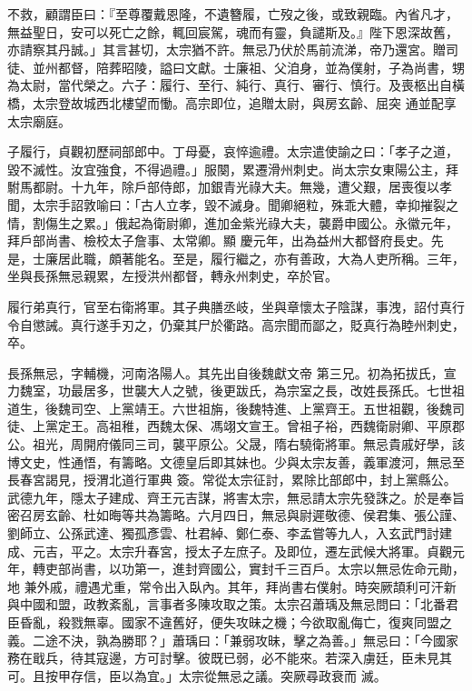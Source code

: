 \begin{pinyinscope}
 不救，顧謂臣曰：『至尊覆戴恩隆，不遺簪履，亡歿之後，或致親臨。內省凡才，無益聖日，安可以死亡之餘，輒回宸駕，魂而有靈，負譴斯及。』陛下恩深故舊，亦請察其丹誠。」其言甚切，太宗猶不許。無忌乃伏於馬前流涕，帝乃還宮。贈司徒、並州都督，陪葬昭陵，謚曰文獻。士廉祖、父洎身，並為僕射，子為尚書，甥為太尉，當代榮之。六子：履行、至行、純行、真行、審行、慎行。及喪柩出自橫橋，太宗登故城西北樓望而慟。高宗即位，追贈太尉，與房玄齡、屈突
 通並配享太宗廟庭。



 子履行，貞觀初歷祠部郎中。丁母憂，哀悴逾禮。太宗遣使諭之曰：「孝子之道，毀不滅性。汝宜強食，不得過禮。」服闋，累遷滑州刺史。尚太宗女東陽公主，拜駙馬都尉。十九年，除戶部侍郎，加銀青光祿大夫。無幾，遭父艱，居喪復以孝聞，太宗手詔敦喻曰：「古人立孝，毀不滅身。聞卿絕粒，殊乖大體，幸抑摧裂之情，割傷生之累。」俄起為衛尉卿，進加金紫光祿大夫，襲爵申國公。永徽元年，拜戶部尚書、檢校太子詹事、太常卿。顯
 慶元年，出為益州大都督府長史。先是，士廉居此職，頗著能名。至是，履行繼之，亦有善政，大為人吏所稱。三年，坐與長孫無忌親累，左授洪州都督，轉永州刺史，卒於官。



 履行弟真行，官至右衛將軍。其子典膳丞岐，坐與章懷太子陰謀，事洩，詔付真行令自懲誡。真行遂手刃之，仍棄其尸於衢路。高宗聞而鄙之，貶真行為睦州刺史，卒。



 長孫無忌，字輔機，河南洛陽人。其先出自後魏獻文帝
 第三兄。初為拓拔氏，宣力魏室，功最居多，世襲大人之號，後更跋氏，為宗室之長，改姓長孫氏。七世祖道生，後魏司空、上黨靖王。六世祖旃，後魏特進、上黨齊王。五世祖觀，後魏司徒、上黨定王。高祖稚，西魏太保、馮翊文宣王。曾祖子裕，西魏衛尉卿、平原郡公。祖光，周開府儀同三司，襲平原公。父晟，隋右驍衛將軍。無忌貴戚好學，該博文史，性通悟，有籌略。文德皇后即其妹也。少與太宗友善，義軍渡河，無忌至長春宮謁見，授渭北道行軍典
 簽。常從太宗征討，累除比部郎中，封上黨縣公。武德九年，隱太子建成、齊王元吉謀，將害太宗，無忌請太宗先發誅之。於是奉旨密召房玄齡、杜如晦等共為籌略。六月四日，無忌與尉遲敬德、侯君集、張公謹、劉師立、公孫武達、獨孤彥雲、杜君綽、鄭仁泰、李孟嘗等九人，入玄武門討建成、元吉，平之。太宗升春宮，授太子左庶子。及即位，遷左武候大將軍。貞觀元年，轉吏部尚書，以功第一，進封齊國公，實封千三百戶。太宗以無忌佐命元勛，地
 兼外戚，禮遇尤重，常令出入臥內。其年，拜尚書右僕射。時突厥頡利可汗新與中國和盟，政教紊亂，言事者多陳攻取之策。太宗召蕭瑀及無忌問曰：「北番君臣昏亂，殺戮無辜。國家不違舊好，便失攻昧之機；今欲取亂侮亡，復爽同盟之義。二途不決，孰為勝耶？」蕭瑀曰：「兼弱攻昧，擊之為善。」無忌曰：「今國家務在戢兵，待其寇邊，方可討擊。彼既已弱，必不能來。若深入虜廷，臣未見其可。且按甲存信，臣以為宜。」太宗從無忌之議。突厥尋政衰而
 滅。




\end{pinyinscope}
